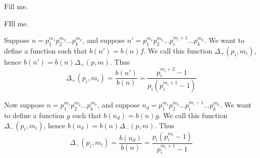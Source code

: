 \documentclass[../paper.tex]{article}
\begin{document}
\begin{theorem}[Property]
Fill me.
\end{theorem}

\begin{theorem}[Property]
FIll me.
\end{theorem}


Suppose $n=p_1^{m_1}p_2^{m_2}...p_{k}^{m_k}$, and suppose 
$n'=p_1^{m_1}p_2^{m_2}...p_i^{m_i + 1}...p_{k}^{m_k}$. We want
to define a function such that $b(n') = b(n) f$. We call this
function $\Delta_{+}(p_i, m_i)$, hence $b(n') = b(n) \Delta_{+}(p,m)$.
Thus 
%
$$\Delta_{+}(p_i, m_i) = \frac{b(n')}{b(n)} = 
\frac{p_i^{m_i+2} - 1}{ p_i (p_i^{m_i + 1} - 1)}$$
%

	Now suppose $n=p_1^{m_1}p_2^{m_2}...p_{k}^{m_k}$, and suppose 
$n_d=p_1^{m_1}p_2^{m_2}...p_i^{m_i - 1}...p_{k}^{m_k}$. We want
to define a function $g$ such that $b(n_d) = b(n) g$. We call this
function $\Delta_{-}(p_i, m_i)$, hence $b(n_d) = b(n) \Delta_{-}(p,m)$.
Thus 
%
$$\Delta_{-}(p_i, m_i) = \frac{b(n_d)}{b(n)} = 
\frac{p_i(p_i^{m_i} - 1)}{ p_i^{m_i + 1} - 1}$$
%
\end{document}
